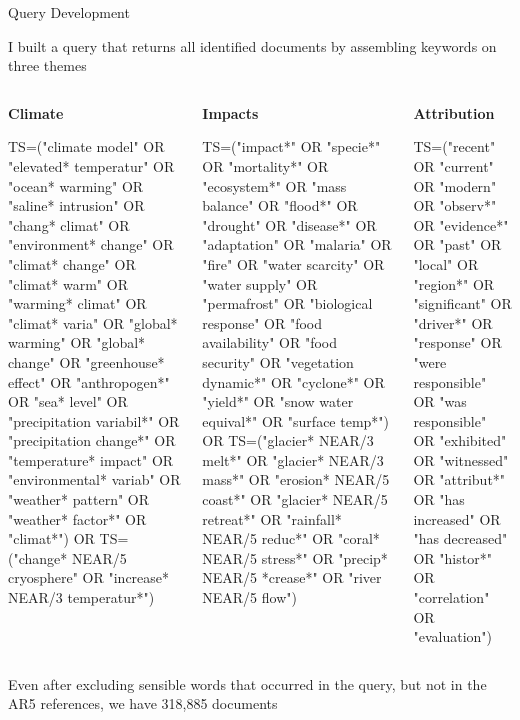 \documentclass[9pt]{beamer}
\begin{document}
\begin{frame}{Query Development}

I built a query that returns all identified documents by assembling keywords on three themes

\medskip

\begin{columns}[t]
	\begin{column}{0.33\linewidth}
		\textbf{Climate}
		
		\scriptsize
		
		TS=("climate model" OR "elevated* temperatur" OR "ocean* warming" OR "saline* intrusion" OR "chang* climat" OR "environment* change" OR "climat* change" OR "climat* warm" OR "warming* climat" OR "climat* varia" OR "global* warming" OR "global* change" OR "greenhouse* effect" OR "anthropogen*" OR "sea* level" OR "precipitation variabil*" OR "precipitation change*" OR "temperature* impact" OR "environmental* variab" OR "weather* pattern" OR "weather* factor*" OR "climat*") OR TS=("change* NEAR/5  cryosphere" OR "increase* NEAR/3  temperatur*")
	\end{column}
	\begin{column}{0.33\linewidth}
		\textbf{Impacts}
		
		\scriptsize
		TS=("impact*" OR "specie*" OR "mortality*" OR "ecosystem*" OR "mass balance" OR "flood*" OR "drought" OR "disease*" OR "adaptation" OR "malaria" OR "fire" OR "water scarcity" OR "water supply" OR "permafrost" OR "biological response" OR "food availability" OR "food security" OR "vegetation dynamic*" OR "cyclone*" OR "yield*" OR "snow water equival*" OR "surface temp*") OR TS=("glacier* NEAR/3  melt*" OR "glacier* NEAR/3  mass*" OR "erosion* NEAR/5  coast*" OR "glacier* NEAR/5  retreat*" OR "rainfall* NEAR/5  reduc*" OR "coral* NEAR/5  stress*" OR "precip* NEAR/5  *crease*" OR "river NEAR/5  flow")
	\end{column}
	\begin{column}{0.33\linewidth}
		\textbf{Attribution}
		
		\scriptsize
		TS=("recent" OR "current" OR "modern" OR "observ*" OR "evidence*" OR "past" OR "local" OR "region*" OR "significant" OR "driver*" OR "response" OR "were responsible" OR "was responsible" OR "exhibited" OR "witnessed" OR "attribut*" OR "has increased" OR "has decreased" OR "histor*" OR "correlation" OR "evaluation")
	\end{column}
\end{columns}

\medskip

Even after excluding sensible words that occurred in the query, but not in the AR5 references, we have 318,885 documents

\end{frame}
\end{document}
